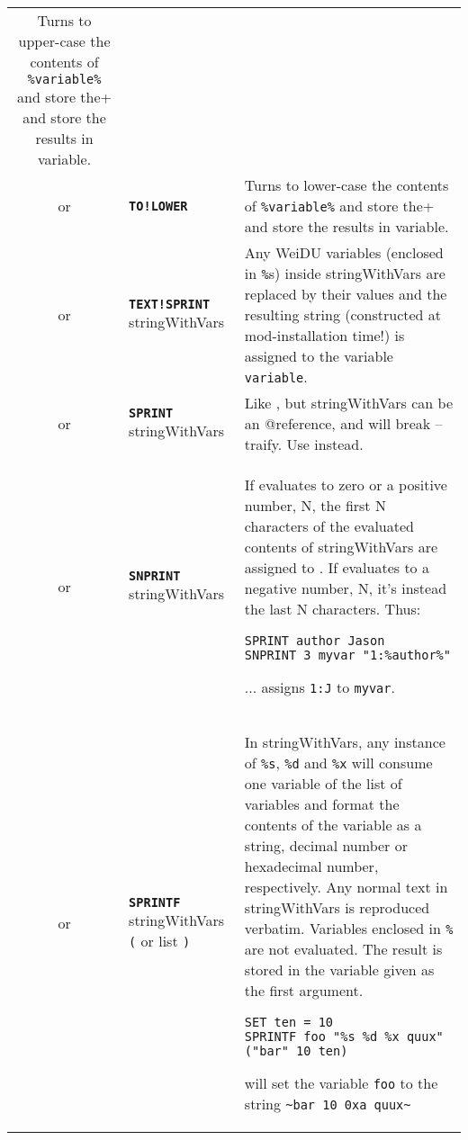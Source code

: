 \documentclass{article}
\def\ttref#1{\ahrefloc{#1}{\tt #1}}
\def\DEFINE#1{{\tt \bf #1}\label{#1}\index{#1}}
\def\t#1{{\tt #1}}
\def\Slist{{\color{red} list }}
\begin{document}
\begin{tabular}{cp{10in}|p{10in}}
  Turns to upper-case the contents of \verb+%variable%+ and store the
  results in variable. \\
or & \DEFINE{TO!LOWER} \ttref{variable} &
  Turns to lower-case the contents of \verb+%variable%+ and store the
  results in variable. \\
or & \DEFINE{TEXT!SPRINT} \ttref{variable} stringWithVars &
  Any WeiDU variables (enclosed in \t{\%}s) inside stringWithVars are
  replaced by their values and the resulting string (constructed at
  mod-installation time!) is assigned to the variable \t{variable}. \\
or & \DEFINE{SPRINT} \ttref{variable} stringWithVars &
  Like \ttref{TEXT!SPRINT}, but stringWithVars can be an @reference, and will
  break --traify. Use \ttref{TEXT!SPRINT} instead. \\

  or & \DEFINE{SNPRINT} \ttref{value} \ttref{variable} stringWithVars &
  If \ttref{value} evaluates to zero or a positive number, N, the first
  N characters of the evaluated contents of stringWithVars are
  assigned to \ttref{variable}. If \ttref{value} evaluates to a
  negative number, N, it's instead the last N characters. Thus:
\begin{verbatim}
SPRINT author Jason
SNPRINT 3 myvar "1:%author%"
\end{verbatim}
  ... assigns \t{1:J} to \t{myvar}.  \\

or & \DEFINE{SPRINTF} \ttref{variable} stringWithVars
\t{(} \ttref{variable} or \ttref{value}  \Slist \t{)} &
In stringWithVars, any instance of \t{\%s}, \t{\%d} and \t{\%x} will consume
one variable of the list of variables and format the contents of the variable
as a string, decimal number or hexadecimal number, respectively. Any normal text
in stringWithVars is reproduced verbatim. Variables enclosed in \t{\%} are not
evaluated. The result is stored in the variable given as the first argument.
\begin{verbatim}
SET ten = 10
SPRINTF foo "%s %d %x quux" ("bar" 10 ten)
\end{verbatim}
will set the variable \t{foo} to the string \verb+~bar 10 0xa quux~+ \\


\end{tabular}
\end{document}
